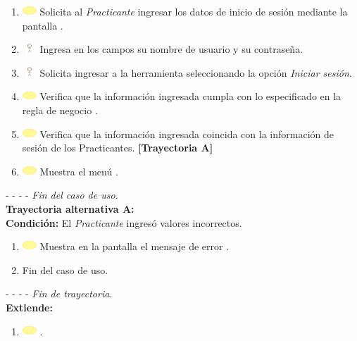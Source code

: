 \begin{enumerate}
	\item \includegraphics[width=15pt]{./Figuras/iconosCU/herramienta.png} Solicita al \textit{Practicante} ingresar los datos de inicio de sesión mediante la pantalla .
	\item \includegraphics[width=15pt, height=10pt]{./Figuras/iconosCU/usuario.png} Ingresa en los campos su nombre de usuario y su contraseña.
	\item \includegraphics[width=15pt, height=10pt]{./Figuras/iconosCU/usuario.png} Solicita ingresar a la herramienta seleccionando la opción \textit{Iniciar sesión}.
	\item \includegraphics[width=15pt]{./Figuras/iconosCU/herramienta.png} Verifica que la información ingresada cumpla con lo especificado en la regla de negocio .
	\item \includegraphics[width=15pt]{./Figuras/iconosCU/herramienta.png} Verifica que la información ingresada coincida con la información de sesión de los Practicantes. \textbf{[Trayectoria A]}
	\item \includegraphics[width=15pt]{./Figuras/iconosCU/herramienta.png} Muestra el menú .
\end{enumerate}
	
- - - - \textit{Fin del caso de uso.} \\


\textbf{\large{Trayectoria alternativa A:}} \\
\textbf{Condición: } El \textit{Practicante} ingresó valores incorrectos.

\begin{enumerate}
	\item \includegraphics[width=15pt]{./Figuras/iconosCU/herramienta.png} Muestra en la pantalla  el mensaje de error .
	\item Fin del caso de uso.
\end{enumerate}

- - - - \textit{Fin de trayectoria.} \\

\textbf{\large{Extiende:}}\\

\begin{enumerate}
	\item \includegraphics[width=15pt]{./Figuras/iconosCU/herramienta.png} .
\end{enumerate}
\clearpage
